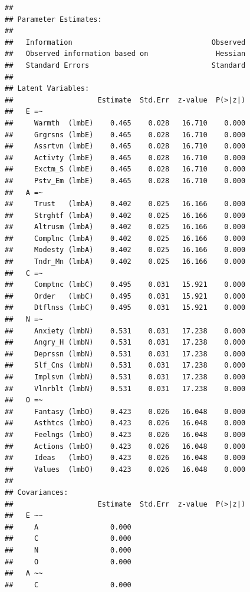 \documentclass{article}\usepackage[]{graphicx}\usepackage[]{color}
\makeatletter
\newenvironment{kframe}{%
 \def\at@end@of@kframe{}%
 \ifinner\ifhmode%
  \def\at@end@of@kframe{\end{minipage}}%
  \begin{minipage}{\columnwidth}%
 \fi\fi%
 \def\FrameCommand##1{\hskip\@totalleftmargin \hskip-\fboxsep
 \colorbox{shadecolor}{##1}\hskip-\fboxsep
     \hskip-\linewidth \hskip-\@totalleftmargin \hskip\columnwidth}%
 \MakeFramed {\advance\hsize-\width
   \@totalleftmargin\z@ \linewidth\hsize
   \@setminipage}}%
 {\par\unskip\endMakeFramed%
 \at@end@of@kframe}
\newenvironment{knitrout}{}{} %
\makeatother
\begin{document}
\begin{knitrout}
\begin{kframe}
\begin{verbatim}
## 
## Parameter Estimates:
## 
##   Information                                 Observed
##   Observed information based on                Hessian
##   Standard Errors                             Standard
## 
## Latent Variables:
##                    Estimate  Std.Err  z-value  P(>|z|)
##   E =~                                                
##     Warmth  (lmbE)    0.465    0.028   16.710    0.000
##     Grgrsns (lmbE)    0.465    0.028   16.710    0.000
##     Assrtvn (lmbE)    0.465    0.028   16.710    0.000
##     Activty (lmbE)    0.465    0.028   16.710    0.000
##     Exctm_S (lmbE)    0.465    0.028   16.710    0.000
##     Pstv_Em (lmbE)    0.465    0.028   16.710    0.000
##   A =~                                                
##     Trust   (lmbA)    0.402    0.025   16.166    0.000
##     Strghtf (lmbA)    0.402    0.025   16.166    0.000
##     Altrusm (lmbA)    0.402    0.025   16.166    0.000
##     Complnc (lmbA)    0.402    0.025   16.166    0.000
##     Modesty (lmbA)    0.402    0.025   16.166    0.000
##     Tndr_Mn (lmbA)    0.402    0.025   16.166    0.000
##   C =~                                                
##     Comptnc (lmbC)    0.495    0.031   15.921    0.000
##     Order   (lmbC)    0.495    0.031   15.921    0.000
##     Dtflnss (lmbC)    0.495    0.031   15.921    0.000
##   N =~                                                
##     Anxiety (lmbN)    0.531    0.031   17.238    0.000
##     Angry_H (lmbN)    0.531    0.031   17.238    0.000
##     Deprssn (lmbN)    0.531    0.031   17.238    0.000
##     Slf_Cns (lmbN)    0.531    0.031   17.238    0.000
##     Implsvn (lmbN)    0.531    0.031   17.238    0.000
##     Vlnrblt (lmbN)    0.531    0.031   17.238    0.000
##   O =~                                                
##     Fantasy (lmbO)    0.423    0.026   16.048    0.000
##     Asthtcs (lmbO)    0.423    0.026   16.048    0.000
##     Feelngs (lmbO)    0.423    0.026   16.048    0.000
##     Actions (lmbO)    0.423    0.026   16.048    0.000
##     Ideas   (lmbO)    0.423    0.026   16.048    0.000
##     Values  (lmbO)    0.423    0.026   16.048    0.000
## 
## Covariances:
##                    Estimate  Std.Err  z-value  P(>|z|)
##   E ~~                                                
##     A                 0.000                           
##     C                 0.000                           
##     N                 0.000                           
##     O                 0.000                           
##   A ~~                                                
##     C                 0.000                           

\end{verbatim}
\end{kframe}
\end{knitrout}
\end{document}
